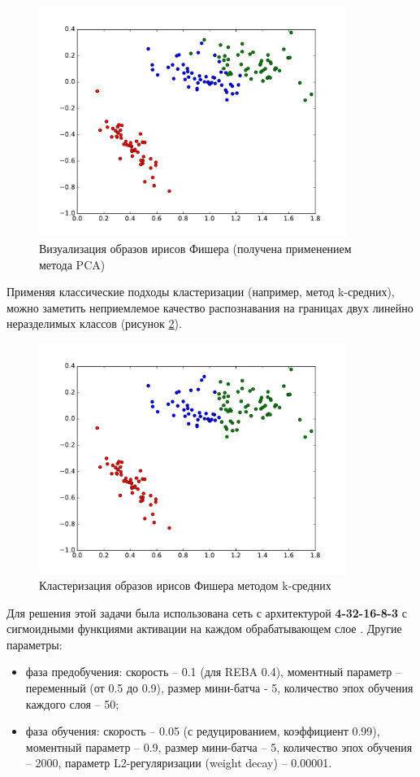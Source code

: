 \begin{figure}[h]
	\begin{center}
		\includegraphics[width=10cm]{man-source/images/ch3/pic3-8.pdf}
		\caption{Визуализация образов ирисов Фишера (получена применением метода PCA)}				
		\label{fig:irises_visualize}
	\end{center}
\end{figure}

Применяя классические подходы кластеризации (например, метод k-средних), можно заметить неприемлемое качество распознавания на границах двух линейно неразделимых классов (рисунок \ref{fig:kmeans}).

\begin{figure}[h]
	\begin{center}
		\includegraphics[width=10cm]{man-source/images/ch3/pic3-9.pdf}
		\caption{Кластеризация образов ирисов Фишера методом k-средних}			
		\label{fig:kmeans}
	\end{center}
\end{figure}

Для решения этой задачи была использована сеть с архитектурой \textbf{4-32-16-8-3} с сигмоидными функциями активации на каждом обрабатывающем слое \cite{22-A}. 
Другие параметры:
\begin{itemize}
	\item фаза предобучения: скорость -- 0.1 (для REBA 0.4), моментный параметр -- переменный (от 0.5 до 0.9), размер мини-батча - 5, количество эпох обучения каждого слоя -- 50;
	\item фаза обучения: скорость -- 0.05 (с редуцированием, коэффициент 0.99), моментный параметр -- 0.9, размер мини-батча -- 5, количество эпох обучения -- 2000, параметр L2-регуляризации (weight decay) -- 0.00001.
\end{itemize}

